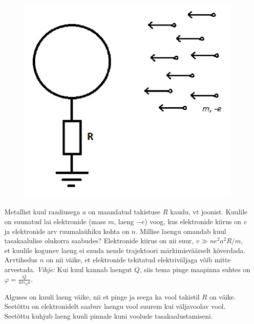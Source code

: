 
\begin{figure}
  \vspace{-25pt}
  \begin{center}
  \includegraphics[width=\linewidth]{2024-v2g-09-yl.png}
  \vspace{-30pt}
  \end{center}
\end{figure}



Metallist kuul raadiusega $a$ on maandatud takistuse $R$ kaudu, vt joonist. Kuulile on suunatud lai elektronide (mass $m$, laeng $-e$) voog, kus elektronide kiirus on $v$ ja elektronide arv ruumalaühiku kohta on  $n$. Millise laengu omandab kuul tasakaalulise olukorra saabudes? Elektronide kiirus on nii suur, $v \gg n e^2 a^2 R / m$, et kuulile kogunev laeng ei suuda nende trajektoori märkimisväärselt kõverdada. Arvtihedus $n$ on nii väike, et elektronide tekitatud elektriväljaga võib mitte arvestada. \textit{Vihje:} Kui kuul kannab laengut $Q$, siis tema pinge maapinna suhtes on $\varphi = \frac{Q}{4\pi\varepsilon_0 a}$.


\hint

\solu
Alguses on kuuli laeng väike, nii et pinge ja seega ka vool takistil $R$ on väike. Seetõttu on elektronidelt saabuv laengu vool suurem kui väljavoolav vool. Seetõttu kuhjub laeng kuuli pinnale kuni voolude tasakaalustamiseni.

